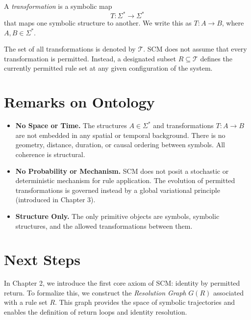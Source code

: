 \begin{definition}[Transformation]
A \emph{transformation} is a symbolic map
\[
T: \Sigma^* \to \Sigma^*
\]
that maps one symbolic structure to another. We write this as $T: A \rightarrow B$, where $A, B \in \Sigma^*$.
\end{definition}

\noindent
The set of all transformations is denoted by $\mathcal{T}$. SCM does not assume that every transformation is permitted. Instead, a designated subset $R \subseteq \mathcal{T}$ defines the currently permitted rule set at any given configuration of the system.

\section{Remarks on Ontology}

\begin{itemize}
    \item \textbf{No Space or Time.} The structures $A \in \Sigma^*$ and transformations $T: A \to B$ are not embedded in any spatial or temporal background. There is no geometry, distance, duration, or causal ordering between symbols. All coherence is structural.
    \item \textbf{No Probability or Mechanism.} SCM does not posit a stochastic or deterministic mechanism for rule application. The evolution of permitted transformations is governed instead by a global variational principle (introduced in Chapter 3).
    \item \textbf{Structure Only.} The only primitive objects are symbols, symbolic structures, and the allowed transformations between them.
\end{itemize}

\section{Next Steps}

In Chapter 2, we introduce the first core axiom of SCM: identity by permitted return. To formalize this, we construct the \emph{Resolution Graph} $G(R)$ associated with a rule set $R$. This graph provides the space of symbolic trajectories and enables the definition of return loops and identity resolution.

